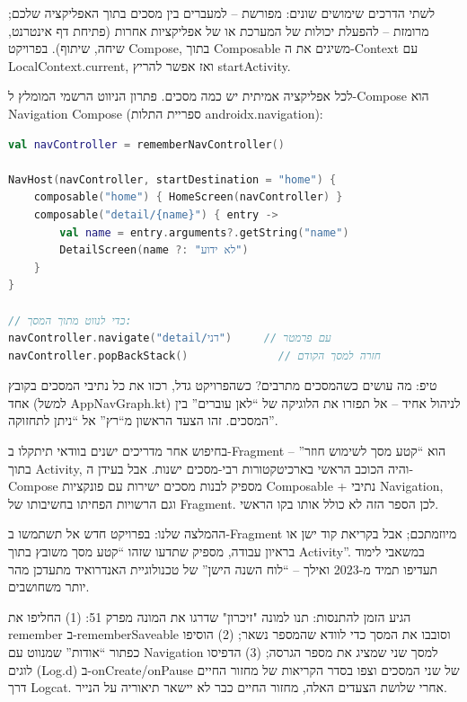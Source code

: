 לשתי הדרכים שימושים שונים: מפורשת – למעברים בין מסכים בתוך האפליקציה שלכם; מרומזת – להפעלת יכולות של המערכת או של אפליקציות אחרות (פתיחת דף אינטרנט, שיחה, שיתוף). בפרויקט Compose, בתוך Composable משיגים את ה-Context עם LocalContext.current, ואז אפשר להריץ startActivity.


לכל אפליקציה אמיתית יש כמה מסכים. פתרון הניווט הרשמי המומלץ ל-Compose הוא Navigation Compose (ספריית התלות androidx.navigation):

\begin{lstlisting}[language=Kotlin]
val navController = rememberNavController()

NavHost(navController, startDestination = "home") {
    composable("home") { HomeScreen(navController) }
    composable("detail/{name}") { entry ->
        val name = entry.arguments?.getString("name")
        DetailScreen(name ?: "לא ידוע")
    }
}

// כדי לנווט מתוך המסך:
navController.navigate("detail/דני")     // עם פרמטר
navController.popBackStack()              // חזרה למסך הקודם
\end{lstlisting}

\begin{tcbinfo}{טיפ: מה עושים כשהמסכים מתרבים?}
כשהפרויקט גדל, רכזו את כל נתיבי המסכים בקובץ אחד (למשל AppNavGraph.kt) לניהול אחיד – אל תפזרו את הלוגיקה של “לאן עוברים” בין המסכים. זהו הצעד הראשון מ“רץ” אל “ניתן לתחזוקה”.

\end{tcbinfo}


בחיפוש אחר מדריכים ישנים בוודאי תיתקלו ב-Fragment – הוא “קטע מסך לשימוש חוזר” בתוך Activity, והיה הכוכב הראשי בארכיטקטורות רבי-מסכים ישנות. אבל בעידן ה-Compose מספיק לבנות מסכים ישירות עם פונקציות Composable + נתיבי Navigation, וגם הרשויות הפחיתו בחשיבותו של Fragment. לכן הספר הזה לא כולל אותו בקו הראשי.

ההמלצה שלנו: בפרויקט חדש אל תשתמשו ב-Fragment מיוזמתכם; אבל בקריאת קוד ישן או בראיון עבודה, מספיק שתדעו שזהו “קטע מסך משובץ בתוך Activity”. במשאבי לימוד תעדיפו תמיד מ-2023 ואילך – “לוח השנה הישן” של טכנולוגיית האנדרואיד מתעדכן מהר יותר משחושבים.

\begin{tcbpractice}{הגיע הזמן להתנסות: תנו למונה "זיכרון"}
שדרגו את המונה מפרק 51: ‏(1) החליפו את remember ב-rememberSaveable וסובבו את המסך כדי לוודא שהמספר נשאר; (2) הוסיפו כפתור “אודות” שמנווט עם Navigation למסך שני שמציג את מספר הגרסה; (3) הדפיסו לוגים (Log.d) ב-onCreate/onPause של שני המסכים וצפו בסדר הקריאות של מחזור החיים דרך Logcat. אחרי שלושת הצעדים האלה, מחזור החיים כבר לא יישאר תיאוריה על הנייר.

\end{tcbpractice}

